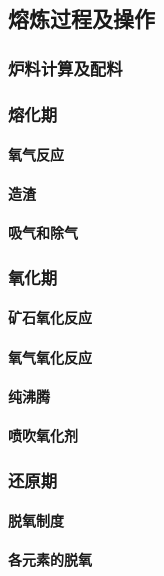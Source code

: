 \documentclass[UTF8]{../../ApplicationUniverse}
\begin{document}
    \subsection{熔炼过程及操作}
        \subsubsection{炉料计算及配料}
        \subsubsection{熔化期}
            \paragraph{氧气反应}
            \paragraph{造渣}
            \paragraph{吸气和除气}
        \subsubsection{氧化期}
            \paragraph{矿石氧化反应}
            \paragraph{氧气氧化反应}
            \paragraph{纯沸腾}
            \paragraph{喷吹氧化剂}
        \subsubsection{还原期}
            \paragraph{脱氧制度}
            \paragraph{各元素的脱氧}
\end{document}
